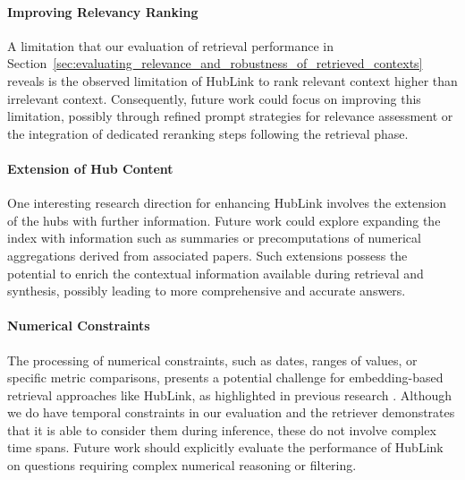 \paragraph{Improving Relevancy Ranking} A limitation that our evaluation of retrieval performance in Section~\ref{sec:evaluating_relevance_and_robustness_of_retrieved_contexts} reveals is the observed limitation of HubLink to rank relevant context higher than irrelevant context. Consequently, future work could focus on improving this limitation, possibly through refined prompt strategies for relevance assessment or the integration of dedicated reranking steps following the retrieval phase.

\paragraph{Extension of Hub Content} One interesting research direction for enhancing HubLink involves the extension of the hubs with further information. Future work could explore expanding the index with information such as summaries or precomputations of numerical aggregations derived from associated papers. Such extensions possess the potential to enrich the contextual information available during retrieval and synthesis, possibly leading to more comprehensive and accurate answers.

\paragraph{Numerical Constraints} The processing of numerical constraints, such as dates, ranges of values, or specific metric comparisons, presents a potential challenge for embedding-based retrieval approaches like HubLink, as highlighted in previous research \cite{jin_floating-point_2024}. Although we do have temporal constraints in our evaluation and the retriever demonstrates that it is able to consider them during inference, these do not involve complex time spans. Future work should explicitly evaluate the performance of HubLink on questions requiring complex numerical reasoning or filtering.

